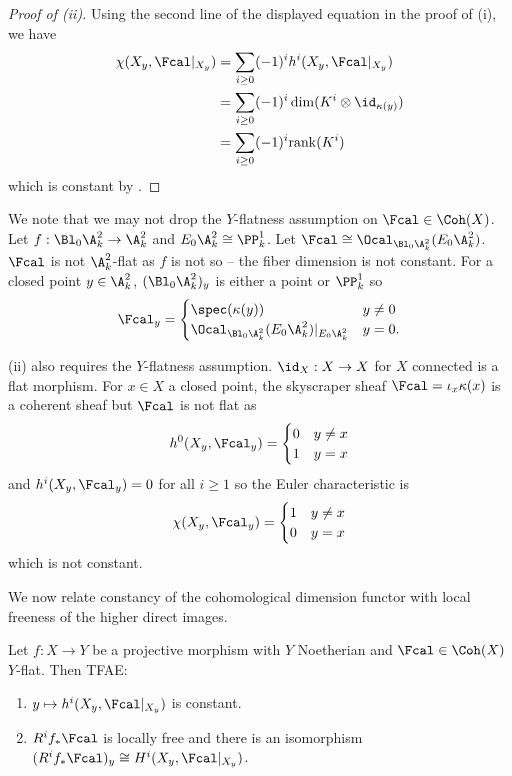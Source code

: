 \begin{proof}[Proof of (ii)]
    Using the second line of the displayed equation in the proof of (i), we have 
    \begin{align*}
        \chi(X_{y},\Fcal|_{X_{y}})&=\sum_{i\geq0}(-1)^{i}h^{i}(X_{y},\Fcal|_{X_{y}})\\ 
        &=\sum_{i\geq0}(-1)^{i}\dim(K^{i}\otimes\id_{\kappa(y)})\\
        &=\sum_{i\geq0}(-1)^{i}\mathrm{rank}(K^{i})
    \end{align*}
    which is constant by . 
\end{proof}
\begin{remark}
    We note that we may not drop the $Y$-flatness assumption on $\Fcal\in\Coh(X)$. Let $f:\Bl_{0}\A^{2}_{k}\to\A^{2}_{k}$ and $E_{0}\A^{2}_{k}\cong\PP^{1}_{k}$. Let $\Fcal\cong\Ocal_{\Bl_{0}\A^{2}_{k}}(E_{0}\A^{2}_{k})$. $\Fcal$ is not $\A^{2}_{k}$-flat as $f$ is not so -- the fiber dimension is not constant. For a closed point $y\in\A^{2}_{k}$, $(\Bl_{0}\A^{2}_{k})_{y}$ is either a point or $\PP^{1}_{k}$ so 
    $$\Fcal_{y}=\begin{cases}
        \spec(\kappa(y)) & y\neq0 \\
        \Ocal_{\Bl_{0}\A^{2}_{k}}(E_{0}\A^{2}_{k})|_{E_{0}\A^{2}_{k}} & y=0.
    \end{cases}$$

     (ii) also requires the $Y$-flatness assumption. $\id_{X}:X\to X$ for $X$ connected is a flat morphism. For $x\in X$ a closed point, the skyscraper sheaf $\Fcal=\iota_{x}\kappa(x)$ is a coherent sheaf but $\Fcal$ is not flat as
    $$h^{0}(X_{y},\Fcal_{y})=\begin{cases}
        0 & y\neq x \\ 1 & y=x
    \end{cases}$$
    and $h^{i}(X_{y},\Fcal_{y})=0$ for all $i\geq 1$ so the Euler characteristic is
    $$\chi(X_{y},\Fcal_{y})=\begin{cases}
        1 & y\neq x \\ 0 & y=x
    \end{cases}$$
    which is not constant. 
\end{remark}
We now relate constancy of the cohomological dimension functor with local freeness of the higher direct images. 
\begin{proposition}\label{prop: constant cohomology dimension iff higher direct images are locally free}
    Let $f:X\to Y$ be a projective morphism with $Y$ Noetherian and $\Fcal\in\Coh(X)$ $Y$-flat. Then TFAE: 
    \begin{enumerate}[label=(\alph*)]
        \item  $y\mapsto h^{i}(X_{y},\Fcal|_{X_{y}})$ is constant. 
        \item $R^{i}f_{*}\Fcal$ is locally free and there is an isomorphism $(R^{i}f_{*}\Fcal)_{y}\cong H^{i}(X_{y},\Fcal|_{X_{y}})$. 
    \end{enumerate}
\end{proposition}
